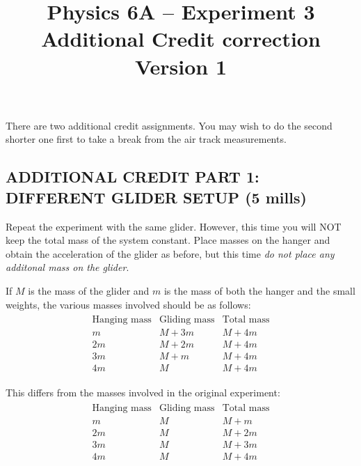\documentclass{article}
\title{Physics 6A -- Experiment 3\\ {\Large Additional Credit correction}
	\\ {\normalsize Version 1}}
\date{}
\begin{document}
\maketitle


There are two additional credit assignments.  You may wish to do the second shorter one first to take a break from the air track measurements.

\begin{comment}
\subsection*{ADDITIONAL CREDIT PART 1: DIFFERENT MASS GLIDER (5 mills)}

Repeat the entire experiment with the second glider, which has a different mass.  Complete another Excel sheet with the data and chart with equation.  Below the chart, type in the mass of the glider obtained experimentally from the slope, the mass obtained by weighing, and the experimental error.  Be sure your chart has a title and the axes are labeled.
\end{comment}

\subsection*{ADDITIONAL CREDIT PART 1: DIFFERENT GLIDER SETUP (5 mills)}

Repeat the experiment with the same glider.
However, this time you will NOT keep the total mass of the system constant.
Place masses on the hanger and obtain the acceleration of the glider as before, 
but this time \emph{do not place any additonal mass on the glider}.

If $M$ is the mass of the glider and $m$ is the mass of both the hanger and the
small weights, the various masses involved should be as
follows:
\begin{align*}
	\begin{array}{c|c|c}
		\text{Hanging mass} & \text{Gliding mass}
		& \text{Total mass}
		\\
		\hline
		m & M+3m & M+4m\\
		2m & M+2m & M+4m\\
		3m & M+m & M+4m\\
		4m & M & M+4m
	\end{array}
\end{align*}

This differs from the masses involved in the original experiment:
\begin{align*}
	\begin{array}{c|c|c}
		\text{Hanging mass} & \text{Gliding mass}
		& \text{Total mass}
		\\
		\hline
		m & M & M+m\\
		2m & M & M+2m\\
		3m & M & M+3m\\
		4m & M & M+4m
	\end{array}
\end{align*}
\end{document}
